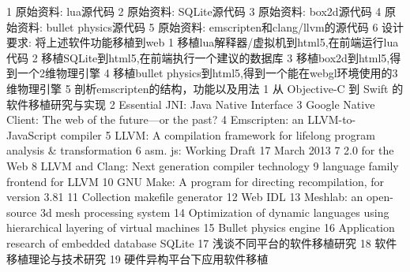 \assignReq
{1 原始资料: lua源代码}
{2 原始资料: SQLite源代码}
{3 原始资料: box2d源代码}
{4 原始资料: bullet physics源代码}
{5 原始资料: emscripten和clang/llvm的源代码}
{6 设计要求: 将上述软件功能移植到web}
\assignWork
{1 移植lua解释器/虚拟机到html5,在前端运行lua代码}
{2 移植SQLite到html5,在前端执行一个建议的数据库}
{3 移植box2d到html5,得到一个2维物理引擎}
{4 移植bullet physics到html5,得到一个能在webgl环境使用的3维物理引擎}
{5 剖析emscripten的结构，功能以及用法}
\assignRef
{1 从 Objective-C 到 Swift 的软件移植研究与实现}
{2 Essential JNI: Java Native Interface}
{3 Google Native Client: The web of the future—or the past?}
{4 Emscripten: an LLVM-to-JavaScript compiler}
{5 LLVM: A compilation framework for lifelong program analysis \& transformation}
{6 asm. js: Working Draft 17 March 2013}
{7 2.0 for the Web}
{8 LLVM and Clang: Next generation compiler technology}
{9 language family frontend for LLVM}
\assignRefTwo
{10 GNU Make: A program for directing recompilation, for version 3.81}
{11 Collection makefile generator}
{12 Web IDL}
{13 Meshlab: an open-source 3d mesh processing system}
{14 Optimization of dynamic languages using hierarchical layering of virtual machines}
\assignRefThree
{15 Bullet physics engine}
{16 Application research of embedded database SQLite}
{17 浅谈不同平台的软件移植研究}
{18 软件移植理论与技术研究}
{19 硬件异构平台下应用软件移植}
